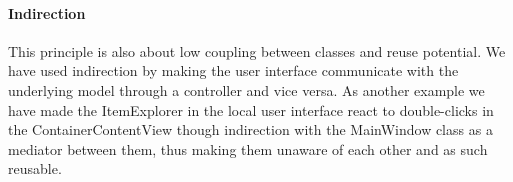 \paragraph{Indirection}
This principle is also about low coupling between classes and reuse potential. We have used indirection by making the user interface communicate with the underlying model through a controller and vice versa. As another example we have made the ItemExplorer in the local user interface react to double-clicks in the ContainerContentView though indirection with the MainWindow class as a mediator between them, thus making them unaware of each other and as such reusable.
